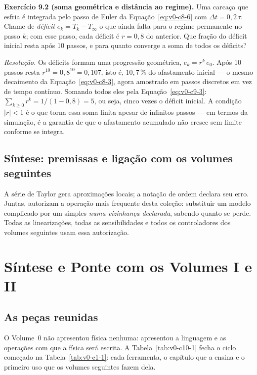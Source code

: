 \documentclass[12pt,a4paper]{article}
\numberwithin{equation}{section}
\numberwithin{table}{section}
\numberwithin{figure}{section}
\begin{document}
\textbf{Exercício 9.2 (soma geométrica e distância ao regime).} Uma
carcaça que esfria é integrada pelo passo de Euler da
Equação~\eqref{eq:v0-c8-6} com $\Delta t = 0{,}2\,\tau$. Chame de
\emph{déficit} $e_k = T_k - T_{\infty}$ o que ainda falta para o regime
permanente no passo $k$; com esse passo, cada déficit é $r = 0{,}8$ do
anterior. Que fração do déficit inicial resta após 10 passos, e para
quanto converge a soma de todos os déficits?

\emph{Resolução.} Os déficits formam uma progressão geométrica,
$e_k = r^k\,e_0$. Após 10 passos resta
$r^{10} = 0{,}8^{10} = 0{,}107$, isto é, $10{,}7\,\%$ do afastamento
inicial --- o mesmo decaimento da Equação~\eqref{eq:v0-c8-3}, agora
amostrado em passos discretos em vez de tempo contínuo. Somando todos
eles pela Equação~\eqref{eq:v0-c9-3}:
$\sum_{k\ge 0} r^k = 1/(1 - 0{,}8) = 5$, ou seja, cinco vezes o déficit
inicial. A condição $|r| < 1$ é o que torna essa soma finita apesar de
infinitos passos --- em termos da simulação, é a garantia de que o
afastamento acumulado não cresce sem limite conforme se integra.

\subsection{Síntese: premissas e ligação com os volumes seguintes}

A série de Taylor gera aproximações locais; a notação de ordem declara seu
erro. Juntas, autorizam a operação mais frequente desta coleção:
substituir um modelo complicado por um simples \emph{numa vizinhança
declarada}, sabendo quanto se perde. Todas as linearizações, todas as
sensibilidades e todos os controladores dos volumes seguintes usam essa
autorização.


\clearpage
\section{Síntese e Ponte com os Volumes I e II}\label{sec:v0-sintese}

\subsection{As peças reunidas}

O Volume~0 não apresentou física nenhuma: apresentou a linguagem e as
operações com que a física será escrita. A Tabela~\ref{tab:v0-c10-1}
fecha o ciclo começado na Tabela~\ref{tab:v0-c1-1}: cada ferramenta, o
capítulo que a ensina e o primeiro uso que os volumes seguintes fazem dela.
\end{document}
